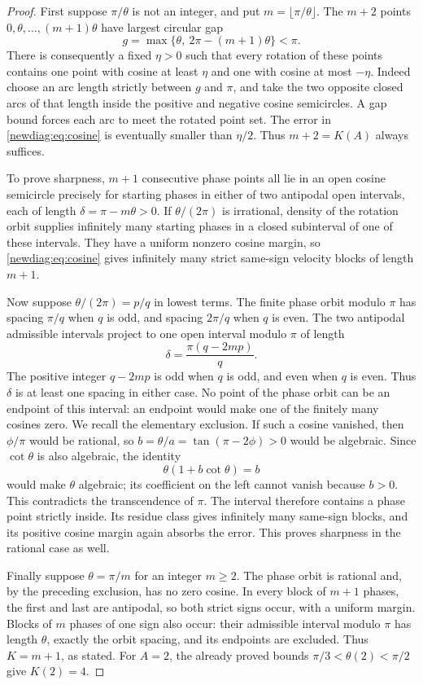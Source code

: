 \begin{proof}
First suppose $\pi/\theta$ is not an integer, and put
$m=\lfloor\pi/\theta\rfloor$.  The $m+2$ points
$0,\theta,\ldots,(m+1)\theta$ have largest circular gap
\[
 g=\max\{\theta,\ 2\pi-(m+1)\theta\}<\pi.
\]
There is consequently a fixed $\eta>0$ such that every rotation of
these points contains one point with cosine at least $\eta$ and one
with cosine at most $-\eta$.  Indeed choose an arc length strictly
between $g$ and $\pi$, and take the two opposite closed arcs of that
length inside the positive and negative cosine semicircles.  A gap
bound forces each arc to meet the rotated point set.  The error in
\eqref{newdiag:eq:cosine} is eventually smaller than $\eta/2$.
Thus $m+2=K(A)$ always suffices.

To prove sharpness, $m+1$ consecutive phase points all lie in an open
cosine semicircle precisely for starting phases in either of two
antipodal open intervals, each of length
$\delta=\pi-m\theta>0$.  If $\theta/(2\pi)$ is irrational, density
of the rotation orbit supplies infinitely many starting phases in a
closed subinterval of one of these intervals.  They have a uniform
nonzero cosine margin, so \eqref{newdiag:eq:cosine} gives infinitely
many strict same-sign velocity blocks of length $m+1$.

Now suppose $\theta/(2\pi)=p/q$ in lowest terms.  The finite phase
orbit modulo $\pi$ has spacing $\pi/q$ when $q$ is odd, and spacing
$2\pi/q$ when $q$ is even.  The two antipodal admissible intervals
project to one open interval modulo $\pi$ of length
\[
 \delta=\frac{\pi(q-2mp)}q.
\]
The positive integer $q-2mp$ is odd when $q$ is odd, and even when
$q$ is even.  Thus $\delta$ is at least one spacing in either case.
No point of the phase orbit can be an endpoint of this interval:
an endpoint would make one of the finitely many cosines zero.  We
recall the elementary exclusion.  If such a cosine vanished, then
$\phi/\pi$ would be rational, so
$b=\theta/a=\tan(\pi-2\phi)>0$ would be algebraic.  Since
$\cot\theta$ is also algebraic, the identity
\[
 \theta(1+b\cot\theta)=b
\]
would make $\theta$ algebraic; its coefficient on the left cannot
vanish because $b>0$.  This contradicts the transcendence of $\pi$.
The interval therefore contains a phase point strictly inside.
Its residue class gives infinitely many same-sign blocks, and its
positive cosine margin again absorbs the error.  This proves
sharpness in the rational case as well.

Finally suppose $\theta=\pi/m$ for an integer $m\geq2$.
The phase orbit is rational and, by the preceding exclusion, has no
zero cosine.  In every block of $m+1$ phases, the first and last
are antipodal, so both strict signs occur, with a uniform margin.
Blocks of $m$ phases of one sign also occur: their admissible interval
modulo $\pi$ has length $\theta$, exactly the orbit spacing, and
its endpoints are excluded.  Thus $K=m+1$, as stated.
For $A=2$, the already proved bounds $\pi/3<\theta(2)<\pi/2$
give $K(2)=4$.
\end{proof}

